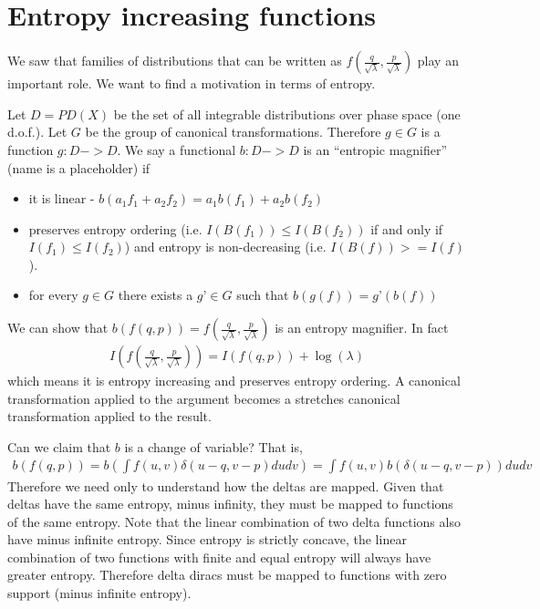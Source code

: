 \documentclass[11pt]{article}
\begin{document}
\section{Entropy increasing functions}

We saw that families of distributions that can be written as $f\left(\frac{q}{\sqrt{\lambda}}, \frac{p}{\sqrt{\lambda}}\right)$ play an important role. We want to find a motivation in terms of entropy.


Let $D = PD(X)$ be the set of all integrable distributions over phase space (one d.o.f.). Let $G$ be the group of canonical transformations. Therefore $g \in G$ is a function $g : D -> D$. We say a functional $b: D -> D$ is an “entropic magnifier” (name is a placeholder) if
\begin{itemize}
	\item it is linear - $b(a_1 f_1 + a_2 f_2) = a_1 b(f_1) + a_2 b(f_2) $
	\item preserves entropy ordering (i.e. $I(B(f_1)) \leq I(B(f_2))$ if and only if $I(f_1) \leq I(f_2)$) and entropy is non-decreasing (i.e. $I(B(f)) >= I(f)$).
	\item for every $g \in G$ there exists a $g’ \in G$ such that $b(g(f)) = g’(b(f))$
\end{itemize}

We can show that $b(f(q,p)) = f\left(\frac{q}{\sqrt{\lambda}}, \frac{p}{\sqrt{\lambda}}\right)$ is an entropy magnifier. In fact
\begin{align}
	I\left(f\left(\frac{q}{\sqrt{\lambda}}, \frac{p}{\sqrt{\lambda}}\right)\right) = I(f(q,p)) + \log(\lambda)
\end{align}
which means it is entropy increasing and preserves entropy ordering. A canonical transformation applied to the argument becomes a stretches canonical transformation applied to the result.

Can we claim that $b$ is a change of variable? That is,
\begin{align}
	b(f(q,p)) = b(\int f(u,v) \delta(u-q, v-p) du dv ) = \int f(u,v) b(\delta(u-q, v-p)) du dv
\end{align}
Therefore we need only to understand how the deltas are mapped. Given that deltas have the same entropy, minus infinity, they must be mapped to functions of the same entropy. Note that the linear combination of two delta functions also have minus infinite entropy. Since entropy is strictly concave, the linear combination of two functions with finite and equal entropy will always have greater entropy. Therefore delta diracs must be mapped to functions with zero support (minus infinite entropy).
\end{document}
